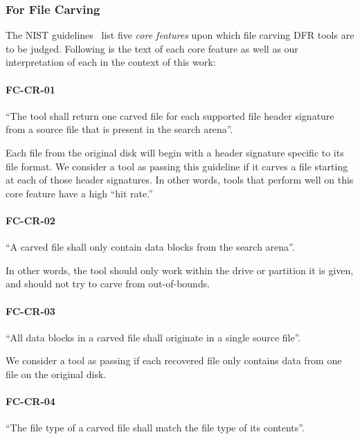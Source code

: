 \subsubsection{For File Carving} \label{sec:carving_features}

\begin{paraphrase}
 The NIST guidelines~\cite{carving_standards} list five \emph{core features} upon which file carving DFR tools are to be judged.
Following is the text of each core feature as well as our interpretation of each in the context of this work:
\end{paraphrase}

 \paragraph{FC-CR-01} ``The tool shall return one carved file for each supported file header signature from a source file that is present in the search arena''.~\cite{carving_standards}
 
 Each file from the original disk will begin with a header signature specific to its file format. We consider a tool as passing this guideline if it carves a file starting at each of those header signatures.
 In other words, tools that perform well on this core feature have a high ``hit rate.''
 
 \paragraph{FC-CR-02} ``A carved file shall only contain data blocks from the search arena''.~\cite{carving_standards}
 
 In other words, the tool should only work within the drive or partition it is given, and should not try to carve from out-of-bounds.
 
 \paragraph{FC-CR-03} ``All data blocks in a carved file shall originate in a single source file''.~\cite{carving_standards}
 
We consider a tool as passing if each recovered file only contains data from one file on the original disk.
 
 \paragraph{FC-CR-04} ``The file type of a carved file shall match the file type of its contents''.~\cite{carving_standards}
 
